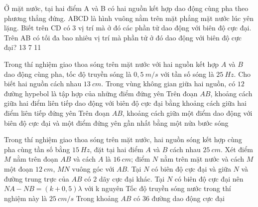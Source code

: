 \begin{ex}%
 Ở mặt nước, tại hai điểm A và B có hai nguồn kết hợp dao động cùng pha theo phương thẳng đứng. ABCD là hình vuông nằm trên mặt phẳng mặt nước lúc yên lặng. Biết trên CD có 3 vị trí mà ở đó các phần tử dao động với biên độ cực đại. Trên AB có tối đa bao nhiêu vị trí mà phần tử ở đó dao động với biên độ cực đại?
\choice
{13}
{7}
{11}
{}
\end{ex} 
\PhanII
\setcounter{ex}{0}
\begin{ex}
Trong thí nghiệm giao thoa sóng trên mặt nước với hai nguồn kết hợp $A$ và $B$ dao động cùng pha, tốc độ truyền sóng là $0,5\ m/s$ với tần số sóng là $25\ Hz$. Cho biết hai nguồn cách nhau $13\ cm$.
{\True Trong vùng không gian giữa hai nguồn, có $12$ đường hypebol là tập hợp của những điểm đứng yên}
{\True Trên đoạn $AB$, khoảng cách giữa hai điểm liên tiếp dao động với biên độ cực đại bằng khoảng cách giữa hai điểm liên tiếp đứng yên}
{Trên đoạn $AB$, khoảng cách giữa một điểm dao động với biên độ cực đại và một điểm đứng yên gần nhất bằng một nửa bước sóng}
\end{ex}
\begin{ex}
Trong thí nghiệm giao thoa sóng trên mặt nước, hai nguồn sóng kết hợp cùng pha cùng tần số bằng $15\ Hz$, đặt tại hai điểm $A$ và $B$ cách nhau $25\ cm$. Xét điểm $M$ nằm trên đoạn $AB$ và cách $A$ là $16\ cm$; điểm $N$ nằm trên mặt nước và cách $M$ một đoạn $12\ cm$, $MN$ vuông góc với $AB$. Tại $N$ có biên độ cực đại và giữa $N$ và đường trung trực của $AB$ có $2$ dãy cực đại khác.
{Tại $N$ có biên độ cực đại nên $NA - NB = (k+0,5)\lambda$ với k nguyên}
{Tốc độ truyền sóng nước trong thí nghiệm này là $25\ cm/s$}
{Trong khoảng $AB$ có $36$ đường dao động cực đại}
\end{ex}

